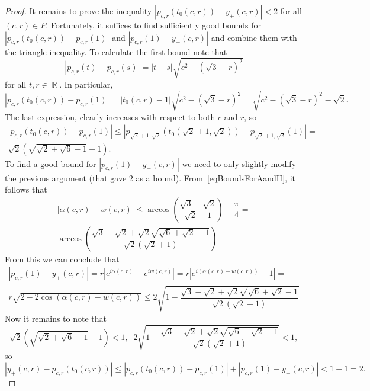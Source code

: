 \documentclass{amsart}
\numberwithin{equation}{section}
\theoremstyle{definition}
\theoremstyle{remark}
\DeclareMathOperator{\RR}{\mathbb R}
\begin{document}
\begin{proof}
		It remains to prove the inequality $|p_{c,r}(t_0(c,r)) - y_+(c,r)| < 2$ for all $(c,r) \in P$. Fortunately, it suffices to find sufficiently good bounds for $|p_{c,r}(t_0(c,r)) - p_{c,r}(1)|$ and $|p_{c,r}(1) - y_+(c,r)|$ and combine them with the triangle inequality. To calculate the first bound note that
		\[
		|p_{c,r}(t) - p_{c,r}(s)| = |t - s| \sqrt{c^2 - (\sqrt{3} - r)^2}
		\]
		for all $t, r \in \RR$. In particular,
		\[
		|p_{c,r}(t_0(c,r)) - p_{c,r}(1)| = |t_0(c,r) - 1|\sqrt{c^2 - (\sqrt{3} - r)^2} = \sqrt{c^2 - (\sqrt{3} - r)^2} - \sqrt{2}.
		\]
		The last expression, clearly increases with respect to both $c$ and $r$, so 
		\begin{multline}\label{eqBoundForPartOfTangentLine}
			|p_{c,r}(t_0(c,r)) - p_{c,r}(1)| \le |p_{\sqrt{2} + 1,\sqrt{2}}(t_0(\sqrt{2} + 1,\sqrt{2})) - p_{\sqrt{2} + 1,\sqrt{2}}(1)|  = \\ \sqrt{2}\left(\sqrt{\sqrt{2} + \sqrt{6} - 1} - 1\right).
		\end{multline}
		To find a good bound for $|p_{c,r}(1) - y_+(c,r)|$ we need to only slightly modify the previous argument (that gave $2$ as a bound). From~\eqref{eqBoundsForAandH}, it follows that 
		\begin{multline*}
			|\alpha(c,r) - w(c,r)| \le \arccos\left(\dfrac{\sqrt{3} - \sqrt{2}}{\sqrt{2} +1}\right) - \dfrac{\pi}{4} = \\ \arccos\left(\dfrac{\sqrt{3} - \sqrt{2} + \sqrt{2}\sqrt{\sqrt{6} + \sqrt{2} - 1}}{\sqrt{2}(\sqrt{2} + 1)}\right)
		\end{multline*}
		From this we can conclude that
		\begin{multline*}
			|p_{c,r}(1) - y_+(c,r)| = r|e^{i\alpha(c,r)} - e^{iw(c,r)}| = r |e^{i(\alpha(c,r) - w(c,r))} - 1| = \\ r\sqrt{2 - 2\cos(\alpha(c,r) - w(c,r))} \le
			2\sqrt{1 - \dfrac{\sqrt{3} - \sqrt{2} + \sqrt{2}\sqrt{\sqrt{6} + \sqrt{2} - 1}}{\sqrt{2}(\sqrt{2} + 1)}}
		\end{multline*}
		Now it remains to note that
		\[
		\sqrt{2}\left(\sqrt{\sqrt{2} + \sqrt{6} - 1} - 1\right) < 1,\;\;2\sqrt{1 - \dfrac{\sqrt{3} - \sqrt{2} + \sqrt{2}\sqrt{\sqrt{6} + \sqrt{2} - 1}}{\sqrt{2}(\sqrt{2} + 1)}} < 1,
		\]
		so
		\[
		|y_+(c,r) - p_{c,r}(t_0(c,r))| \le |p_{c,r}(t_0(c,r)) - p_{c,r}(1)| + |p_{c,r}(1) - y_+(c,r)|< 1 + 1 = 2.
		\]
	\end{proof}
	
\end{document}
